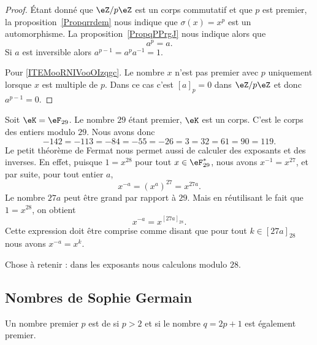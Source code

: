 \begin{proof}
	Étant donné que \( \eZ/p\eZ\) est un corps commutatif et que \( p\) est premier, la proposition~\ref{Propqrrdem} nous indique que \( \sigma(x)=x^p\) est un automorphisme. La proposition~\ref{PropqPPrgJ} nous indique alors que
	\begin{equation}
		a^p=a.
	\end{equation}
	Si \( a\) est inversible alors \( a^{p-1}=a^pa^{-1}=1\).

	Pour \ref{ITEMooRNIVooOIzqgc}. Le nombre \( x\) n'est pas premier avec \( p\) uniquement lorsque \( x\) est multiple de \( p\). Dans ce cas c'est \( [a]_p=0\) dans \( \eZ/p\eZ\) et donc \( a^{p-1}=0\).
\end{proof}

\begin{example}
	Soit \( \eK=\eF_{29}\). Le nombre \( 29\) étant premier, \( \eK\) est un corps. C'est le corps des entiers modulo \( 29\). Nous avons donc
	\begin{equation}
		-142=-113=-84=-55=-26=3=32=61=90=119.
	\end{equation}
	Le petit théorème de Fermat nous permet aussi de calculer des exposants et des inverses. En effet, puisque \( 1=x^{28}\) pour tout \( x \in \eF_{29}^* \), nous avons \( x^{-1}=x^{27}\), et par suite, pour tout entier \( a \),
	\begin{equation}
		x^{-a}=(x^a)^{27}=x^{27a}.
	\end{equation}
	Le nombre \( 27 a\) peut être grand par rapport à \( 29\). Mais en réutilisant le fait que \( 1=x^{28}\), on obtient
	\begin{equation}
		x^{-a}=x^{[27a]_{28}}.
	\end{equation}
	Cette expression doit être comprise comme disant que pour tout \( k\in [27a]_{28}\) nous avons \( x^{-a}=x^{k}\).

	Chose à retenir : dans les exposants nous calculons modulo \( 28\).
\end{example}

\subsection{Nombres de Sophie Germain}


\begin{definition}      \label{DEFooCVFJooKCdVVD}
	Un nombre premier \( p\) est de  si \( p>2\) et si le nombre \( q=2p+1\) est également premier.
\end{definition}

